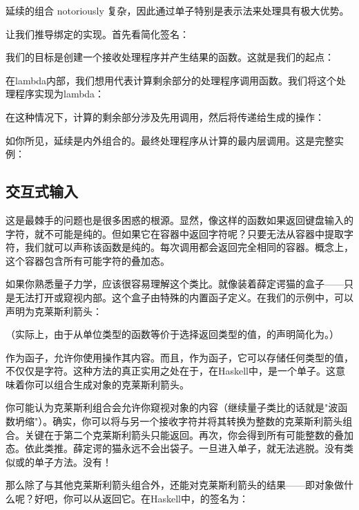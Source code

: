 延续的组合 notoriously 复杂，因此通过单子特别是表示法来处理具有极大优势。

让我们推导绑定的实现。首先看简化签名：

我们的目标是创建一个接收处理程序并产生结果的函数。这就是我们的起点：

在lambda内部，我们想用代表计算剩余部分的处理程序调用函数。我们将这个处理程序实现为lambda：

在这种情况下，计算的剩余部分涉及先用调用，然后将传递给生成的操作：

如你所见，延续是内外组合的。最终处理程序从计算的最内层调用。这是完整实例：


\subsection{交互式输入}

这是最棘手的问题也是很多困惑的根源。显然，像这样的函数如果返回键盘输入的字符，就不可能是纯的。但如果它在容器中返回字符呢？只要无法从容器中提取字符，我们就可以声称该函数是纯的。每次调用都会返回完全相同的容器。概念上，这个容器包含所有可能字符的叠加态。

如果你熟悉量子力学，应该很容易理解这个类比。就像装着薛定谔猫的盒子——只是无法打开或窥视内部。这个盒子由特殊的内置函子定义。在我们的示例中，可以声明为克莱斯利箭头：

（实际上，由于从单位类型的函数等价于选择返回类型的值，的声明简化为。）

作为函子，允许你使用操作其内容。而且，作为函子，它可以存储任何类型的值，不仅仅是字符。这种方法的真正实用之处在于，在Haskell中，是一个单子。这意味着你可以组合生成对象的克莱斯利箭头。

你可能认为克莱斯利组合会允许你窥视对象的内容（继续量子类比的话就是"波函数坍缩"）。确实，你可以将与另一个接收字符并将其转换为整数的克莱斯利箭头组合。关键在于第二个克莱斯利箭头只能返回。再次，你会得到所有可能整数的叠加态。依此类推。薛定谔的猫永远不会出袋子。一旦进入单子，就无法逃脱。没有类似或的单子方法。没有！

那么除了与其他克莱斯利箭头组合外，还能对克莱斯利箭头的结果——即对象做什么呢？好吧，你可以从返回它。在Haskell中，的签名为：

